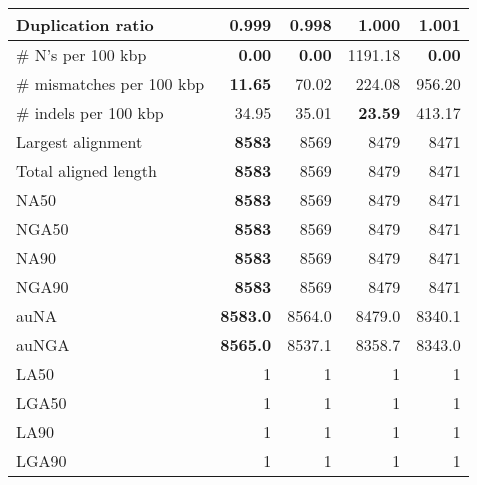 \documentclass[12pt,a4paper]{article}
\begin{document}
\begin{table}[ht]
\begin{center}
\begin{tabular}{|l*{4}{|r}|}
Duplication ratio & 0.999 & {\bf 0.998} & 1.000 & 1.001 \\ \hline
\# N's per 100 kbp & {\bf 0.00} & {\bf 0.00} & 1191.18 & {\bf 0.00} \\ \hline
\# mismatches per 100 kbp & {\bf 11.65} & 70.02 & 224.08 & 956.20 \\ \hline
\# indels per 100 kbp & 34.95 & 35.01 & {\bf 23.59} & 413.17 \\ \hline
Largest alignment & {\bf 8583} & 8569 & 8479 & 8471 \\ \hline
Total aligned length & {\bf 8583} & 8569 & 8479 & 8471 \\ \hline
NA50 & {\bf 8583} & 8569 & 8479 & 8471 \\ \hline
NGA50 & {\bf 8583} & 8569 & 8479 & 8471 \\ \hline
NA90 & {\bf 8583} & 8569 & 8479 & 8471 \\ \hline
NGA90 & {\bf 8583} & 8569 & 8479 & 8471 \\ \hline
auNA & {\bf 8583.0} & 8564.0 & 8479.0 & 8340.1 \\ \hline
auNGA & {\bf 8565.0} & 8537.1 & 8358.7 & 8343.0 \\ \hline
LA50 & 1 & 1 & 1 & 1 \\ \hline
LGA50 & 1 & 1 & 1 & 1 \\ \hline
LA90 & 1 & 1 & 1 & 1 \\ \hline
LGA90 & 1 & 1 & 1 & 1 \\ \hline
\end{tabular}
\end{center}
\end{table}
\end{document}
